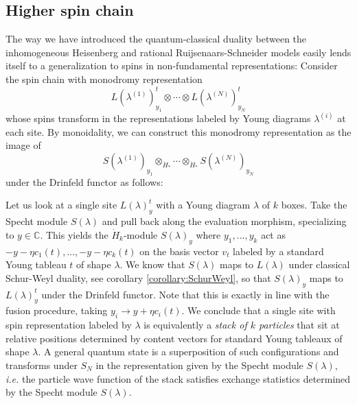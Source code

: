 \documentclass[11pt]{report}
\theoremstyle{definition}
\theoremstyle{remark}
\theoremstyle{remark}
\newcommand{\C}{\mathbb{C}}
\begin{document}
\subsection{Higher spin chain}

The way we have introduced the quantum-classical duality between the inhomogeneous Heisenberg and rational Ruijsenaars-Schneider models easily lends itself to a generalization to spins in non-fundamental representations: Consider the spin chain with monodromy representation
\begin{equation*}
L(\lambda^{(1)})_{y_1}^t \otimes \cdots \otimes L(\lambda^{(N)})_{y_N}^t
\end{equation*}
whose spins transform in the representations labeled by Young diagrams $\lambda^{(i)}$ at each site. By monoidality, we can construct this monodromy representation as the image of
\begin{equation*}
S(\lambda^{(1)})_{y_1} \otimes_{\dot H_*} \cdots \otimes_{\dot H_*} S(\lambda^{(N)})_{y_N}
\end{equation*}
under the Drinfeld functor as follows:

Let us look at a single site $L(\lambda)_y^t$ with a Young diagram $\lambda$ of $k$ boxes. Take the Specht module $S(\lambda)$ and pull back along the evaluation morphism, specializing to $y \in \C$. This yields the $\dot H_k$-module $S(\lambda)_y$ where $y_1,...,y_k$ act as $-y - \eta c_1(t),...,-y-\eta c_k(t)$ on the basis vector $v_t$ labeled by a standard Young tableau $t$ of shape $\lambda$. We know that $S(\lambda)$ maps to $L(\lambda)$ under classical Schur-Weyl duality, see corollary \ref{corollary:SchurWeyl}, so that $S(\lambda)_y$ maps to $L(\lambda)_y^t$ under the Drinfeld functor. Note that this is exactly in line with the fusion procedure, taking $y_i \to y + \eta c_i(t)$. We conclude that a single site with spin representation labeled by $\lambda$ is equivalently a \emph{stack of $k$ particles} that sit at relative positions determined by content vectors for standard Young tableaux of shape $\lambda$. A general quantum state is a superposition of such configurations and transforms under $S_N$ in the representation given by the Specht module $S(\lambda)$, \emph{i.e.} the particle wave function of the stack satisfies exchange statistics determined by the Specht module $S(\lambda)$.
\end{document}
